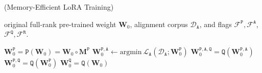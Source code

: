 \begin{algorithm}[ht]
\small
\caption{\method (Memory-Efficient LoRA Training)}
\label{algo:loram}
\begin{algorithmic}[1]
\Require 
original full-rank pre-trained weight $\mathbf{W}_0$, 
alignment corpus $\mathcal{D}_\mathtt{A}$, 
and flags $\mathcal{F}^\mathtt{P}, \mathcal{F}^\mathtt{A}$, $\mathcal{F}^\mathtt{Q}, \mathcal{F}^\mathtt{R}$.

\State {}
    \State $\mathbf{W}_{0}^\mathtt{P} = \mathtt{P}(\mathbf{W}_{0}) =  \mathbf{W}_0 \circ \mathbf{M}^\mathtt{P}$  
        \State $\mathbf{W}_{0}^\mathtt{P,A} \gets \text{argmin} {\ } \mathcal{L}_{\mathtt{A}}(\mathcal{D}_\mathtt{A};\mathbf{W}_{0}^\mathtt{P})$ 
        \State $\mathbf{W}_{0}^\mathtt{P,A,Q} = \mathtt{Q}(\mathbf{W}_{0}^\mathtt{P,A})$
        \EndIf
        \State $\mathbf{W}_{0}^\mathtt{P,Q} = \mathtt{Q}(\mathbf{W}_{0}^\mathtt{P})$
    \EndIf
    \State $\mathbf{W}_{0}^\mathtt{Q} = \mathtt{Q}(\mathbf{W}_{0})$ 
\EndIf

\\
\State {} 


\end{algorithmic}
\end{algorithm}
